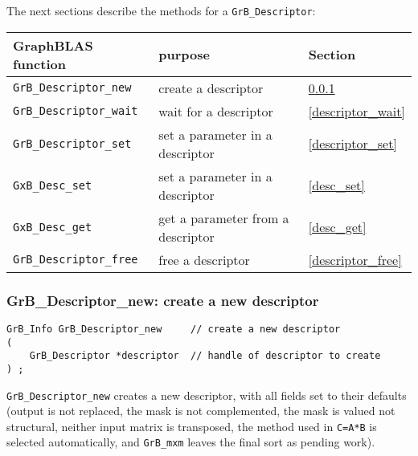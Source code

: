 \documentclass[12pt]{article}
\begin{document}
The next sections describe the methods for a \verb'GrB_Descriptor':

\vspace{0.2in}
{\footnotesize
\begin{tabular}{lll}
\hline
GraphBLAS function   & purpose                                      & Section \\
\hline
\verb'GrB_Descriptor_new'        & create a descriptor                  & \ref{descriptor_new} \\
\verb'GrB_Descriptor_wait'       & wait for a descriptor                & \ref{descriptor_wait} \\
\verb'GrB_Descriptor_set'        & set a parameter in a descriptor      & \ref{descriptor_set} \\
\verb'GxB_Desc_set'              & set a parameter in a descriptor      & \ref{desc_set}  \\
\verb'GxB_Desc_get'              & get a parameter from a descriptor    & \ref{desc_get}  \\
\verb'GrB_Descriptor_free'       & free a descriptor                    & \ref{descriptor_free} \\
\hline
\end{tabular}
}

\newpage
\subsubsection{{\sf GrB\_Descriptor\_new:}  create a new descriptor}
\label{descriptor_new}

\begin{mdframed}[userdefinedwidth=6in]
{\footnotesize
\begin{verbatim}
GrB_Info GrB_Descriptor_new     // create a new descriptor
(
    GrB_Descriptor *descriptor  // handle of descriptor to create
) ;
\end{verbatim} } \end{mdframed}

\verb'GrB_Descriptor_new' creates a new descriptor, with all fields set to
their defaults (output is not replaced, the mask is not complemented, the mask
is valued not structural, neither input matrix is transposed, the method
used in \verb'C=A*B' is selected automatically, and \verb'GrB_mxm' leaves
the final sort as pending work).

\end{document}

